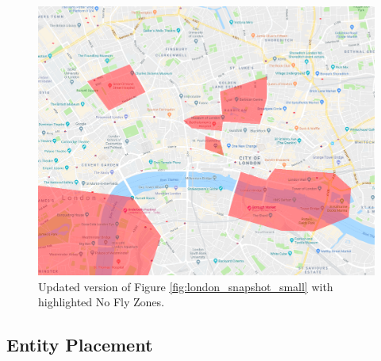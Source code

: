 \documentclass[a4paper,12pt,titlepage]{article}
\begin{document}
\begin{figure}[!hbpt]
  \center
  \includegraphics[width=\linewidth]{img/london_snapshot_small_nfzs.png}
  \caption{Updated version of Figure \ref{fig:london_snapshot_small} with highlighted No Fly Zones.}
  \label{fig:london_snapshot_small_nfzs}
\end{figure}

\subsection{Entity Placement}
\end{document}
